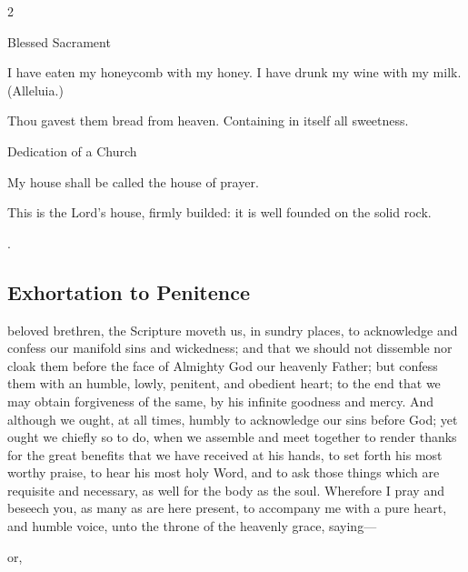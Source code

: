 \begin{multicols}{2}
\centerline{\color{RubricRed}\small%
Blessed Sacrament}
\par\noindent
I have eaten my honeycomb with my honey. I have drunk my wine with my milk. (Alleluia.)

Thou gavest them bread from heaven. Containing in itself all sweetness.\\%

\centerline{\color{RubricRed}\small%
Dedication of a Church}
\par\noindent
	My house shall be called the house of prayer.
	
	This is the Lord's house, firmly builded: it is well founded on the solid rock.\\
	
	
	\vfill
	
	{\color{white}.}
	
\end{multicols}

\subsection{Exhortation to Penitence}
 beloved brethren, the Scripture moveth us, in sundry places, to acknowledge and confess our manifold sins and wickedness; and that we should not dissemble nor cloak them before the face of Almighty God our heavenly Father; but confess them with an humble, lowly, penitent, and obedient heart; to the end that we may obtain forgiveness of the same, by his infinite goodness and mercy. And although we ought, at all times, humbly to acknowledge our sins before God; yet ought we chiefly so to do, when we assemble and meet together to render thanks for the great benefits that we have received at his hands, to set forth his most worthy praise, to hear his most holy Word, and to ask those things which are requisite and necessary, as well for the body as the soul. Wherefore I pray and beseech you, as many as are here present, to accompany me with a pure heart, and humble voice, unto the throne of the heavenly grace, saying---

\begin{inhead}
    or,
\end{inhead}

